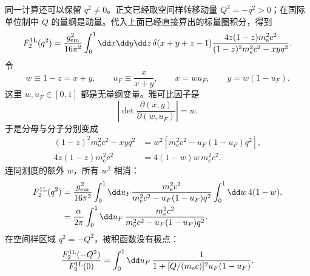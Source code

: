 \begin{derivation}

同一计算还可以保留 $q^2\neq0$。正文已经取空间样转移动量 $Q^2=-q^2>0$；在国际单位制中 $Q$ 的量纲是动量。代入上面已经直接算出的标量圈积分，得到
\begin{equation*}
 F_2^{\rm 1L}(q^2)
 =\frac{g_{\rm em}^2}{16\pi^2}
 \int_0^1\dd x\dd y\dd z\,
 \delta(x+y+z-1)
 \frac{4z(1-z)m_{\mathrm e}^2c^2}
 {(1-z)^2m_{\mathrm e}^2c^2-xyq^2}.
 \end{equation*}
令
\begin{equation*}
 w\equiv1-z=x+y,
 \qquad
 u_F\equiv\frac{x}{x+y},
 \qquad
 x=w u_F,
 \qquad
 y=w(1-u_F).
\end{equation*}
这里 $w,u_F\in[0,1]$ 都是无量纲变量。雅可比因子是
\begin{equation*}
 \left|\det\frac{\partial(x,y)}{\partial(w,u_F)}\right|=w.
\end{equation*}
于是分母与分子分别变成
\begin{align*}
 (1-z)^2m_{\mathrm e}^2c^2-xyq^2
 &=w^2[m_{\mathrm e}^2c^2-u_F(1-u_F)q^2],\\
 4z(1-z)m_{\mathrm e}^2c^2
 &=4(1-w)w\,m_{\mathrm e}^2c^2.
\end{align*}
连同测度的额外 $w$，所有 $w^2$ 相消：
\begin{align*}
 F_2^{\rm 1L}(q^2)
 &=\frac{g_{\rm em}^2}{16\pi^2}
 \int_0^1\dd u_F
 \frac{m_{\mathrm e}^2c^2}{m_{\mathrm e}^2c^2-u_F(1-u_F)q^2}
 \int_0^1\dd w\,4(1-w),\\
 &={
 \frac{\alpha}{2\pi}
 \int_0^1\dd u_F\,
 \frac{m_{\mathrm e}^2c^2}
 {m_{\mathrm e}^2c^2-u_F(1-u_F)q^2}}.
 \end{align*}
在空间样区域 $q^2=-Q^2$，被积函数没有极点：
\begin{equation*}
 \frac{F_2^{\rm 1L}(-Q^2)}{F_2^{\rm 1L}(0)}
 =\int_0^1\dd u_F\,
 \frac1{1+[Q/(m_{\mathrm e} c)]^2u_F(1-u_F)}.
 \end{equation*}
\end{derivation}


